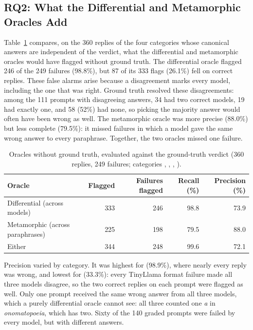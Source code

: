 \subsection{RQ2: What the Differential and Metamorphic Oracles Add}

Table~\ref{tab:oracles} compares, on the 360 replies of the four categories whose canonical answers are independent of the verdict, what the differential and metamorphic oracles would have flagged without ground truth. The differential oracle flagged 246 of the 249 failures (98.8\%), but 87 of its 333 flags (26.1\%) fell on correct replies. These false alarms arise because a disagreement marks every model, including the one that was right. Ground truth resolved these disagreements: among the 111 prompts with disagreeing answers, 34 had two correct models, 19 had exactly one, and 58 (52\%) had none, so picking the majority answer would often have been wrong as well. The metamorphic oracle was more precise (88.0\%) but less complete (79.5\%): it missed failures in which a model gave the same wrong answer to every paraphrase. Together, the two oracles missed one failure.

\begin{table}[ht]
\centering
\caption{Oracles without ground truth, evaluated against the ground-truth verdict (360 replies, 249 failures; categories , , , ).}
\label{tab:oracles}
\footnotesize
\begin{tabular}{@{}lrrrr@{}}
\toprule
Oracle & Flagged & Failures flagged & Recall (\%) & Precision (\%) \\
\midrule
Differential (across models) & 333 & 246 & 98.8 & 73.9 \\
Metamorphic (across paraphrases) & 225 & 198 & 79.5 & 88.0 \\
Either & 344 & 248 & 99.6 & 72.1 \\
\bottomrule
\end{tabular}
\end{table}

Precision varied by category. It was highest for  (98.9\%), where nearly every reply was wrong, and lowest for  (33.3\%): every TinyLlama format failure made all three models disagree, so the two correct replies on each prompt were flagged as well. Only one prompt received the same wrong answer from all three models, which a purely differential oracle cannot see: all three counted one \emph{a} in \emph{onomatopoeia}, which has two. Sixty of the 140 graded prompts were failed by every model, but with different answers.


